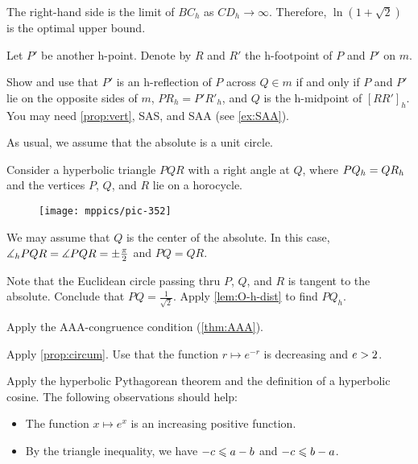The right-hand side is the limit of $BC_h$ as $CD_h\to\infty$.
Therefore, $\ln\left(1+\sqrt{2}\right)$ is the optimal upper bound.


Let $P'$ be another h-point.
Denote by $R$ and $R'$ the h-footpoint of $P$ and $P'$ on $m$.

Show and use that $P'$ is an h-reflection of $P$ across $Q\in m$ if and only if $P$ and $P'$ lie on the opposite sides of $m$, 
$PR_h=P'R'_h$, and $Q$ is the h-midpoint of $[RR']_h$. 
You may need \ref{prop:vert}, SAS, and SAA (see \ref{ex:SAA}).

As usual, we assume that the absolute is a unit circle. 

Consider a hyperbolic triangle $PQR$
with a right angle at $Q$, where  $PQ_h=QR_h$
and the vertices $P$, $Q$, and $R$ 
lie on a horocycle.

\begin{wrapfigure}{r}{32mm}
\vskip-3mm
\centering
\texttt{[image: mppics/pic-352]}
\end{wrapfigure}

We may assume that $Q$ is the center of the absolute.
In this case, $\measuredangle_hPQR=\measuredangle PQR=\pm\tfrac\pi2$ and $PQ=QR$.

Note that the Euclidean circle passing thru $P$, $Q$, and $R$ is tangent to the absolute.
Conclude that $PQ=\tfrac1{\sqrt2}$. 
Apply \ref{lem:O-h-dist} to find $PQ_h$.


Apply the AAA-congruence condition (\ref{thm:AAA}).

Apply \ref{prop:circum}.
Use that the function $r\mapsto e^{-r}$ is decreasing and $e>2$.

Apply the hyperbolic Pythagorean theorem and the definition of a hyperbolic cosine.
The following observations should help:
\begin{itemize}
 \item The function $x\mapsto e^x$ is an increasing positive function.
 \item By the triangle inequality,  we have $-c\leqslant a-b$ and $-c\leqslant b-a$.
\end{itemize}

\setcounter{eqtn}{0}


